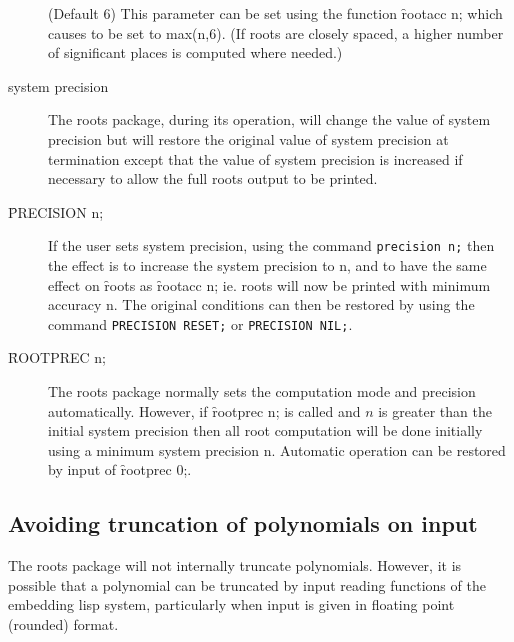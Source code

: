 \begin{description}
\item[]
\hypertarget{reserved:ROOTACC}{}
\hypertarget{operator:ROOTACC}{}
  (Default 6) This parameter can be set using the function
\f{rootacc} n; which causes  to be set to max(n,6).
(If roots are closely spaced, a higher number of
significant places is computed where needed.)

\item[system precision]
The roots package, during its operation, will
change the value of system precision but will restore the original value
of system precision at termination except that the value of system
precision is increased if necessary to allow the full roots output to be
printed.

\item[\f{PRECISION} n;]
If the user sets system precision, using the command
\texttt{precision n;} then the effect is to increase the system precision to n, and
to have the same effect on \f{roots} as \f{rootacc} n; ie. roots will now be
printed with minimum accuracy n.  The original conditions can then be
restored by using the command \texttt{PRECISION RESET;} or \texttt{PRECISION NIL;}.

\item[\f{ROOTPREC} n;]
  \hypertarget{operator:ROOTPREC}{}
The roots package normally sets the computation mode and
precision automatically.  However, if \f{rootprec} n; is
called and $n$ is greater than the initial system precision then all root
computation will be done initially using a minimum system precision n.
Automatic operation can be restored by input of \f{rootprec} 0;.
\end{description}


\subsection{Avoiding truncation of polynomials on input}

The roots package will not internally truncate polynomials.  However, it
is possible that a polynomial can be truncated by input reading functions
of the embedding lisp system, particularly when input is given in floating
point (rounded) format.

